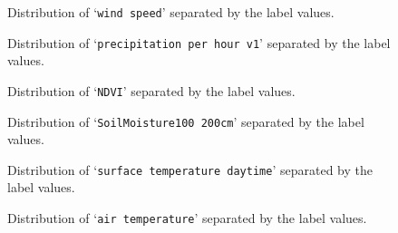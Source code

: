 \documentclass[10pt,parskip=half,
toc=sectionentrywithdots,
bibliography=totocnumbered,
captions=tableheading,numbers=noendperiod]{scrartcl}
\begin{document}
\begin{figure}[H]\begin{center}\end{center}\caption{Distribution of `\texttt{wind\ speed}' separated by the label values.}\label{fig_dist13}\end{figure}

\begin{figure}[H]\begin{center}\end{center}\caption{Distribution of `\texttt{precipitation\ per\ hour\ v1}' separated by the
label values.}\label{fig_dist14}\end{figure}

\begin{figure}[H]\begin{center}\end{center}\caption{Distribution of `\texttt{NDVI}' separated by the label values.}\label{fig_dist15}\end{figure}

\begin{figure}[H]\begin{center}\end{center}\caption{Distribution of `\texttt{SoilMoisture100\ 200cm}' separated by the label
values.}\label{fig_dist16}\end{figure}

\begin{figure}[H]\begin{center}\end{center}\caption{Distribution of `\texttt{surface\ temperature\ daytime}' separated by
the label values.}\label{fig_dist17}\end{figure}

\begin{figure}[H]\begin{center}\end{center}\caption{Distribution of `\texttt{air\ temperature}' separated by the label
values.}\label{fig_dist18}\end{figure}
\end{document}

